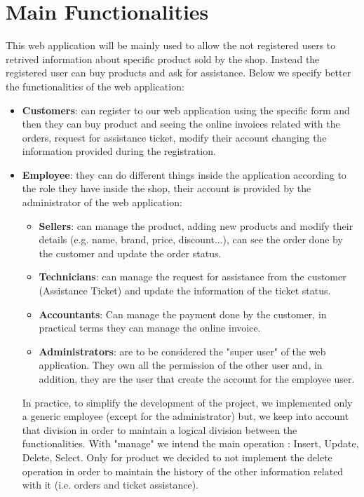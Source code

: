 \section{Main Functionalities}

This web application will be mainly used to allow the not registered users to retrived information about specific product sold by the shop. Instead the registered user can buy products and ask for assistance. Below we specify better the functionalities of the web application:
\begin{itemize}
    \item \textbf{Customers}: can register to our web application using the specific form and then they can buy product and seeing the online invoices related with the orders, request for assistance ticket, modify their account changing the information provided during the registration.
    \item \textbf{Employee}: they can do different things inside the application according to the role they have inside the shop, their account is provided by the administrator of the web application:
    \begin{itemize}
        \item \textbf{Sellers}: can manage the product, adding new products and modify their details (e.g. name, brand, price, discount...), can see the order done by the customer and update the order status.
        \item \textbf{Technicians}: can manage the request for assistance from the customer (Assistance Ticket) and update the information of the ticket status.
        \item \textbf{Accountants}: Can manage the payment done by the customer, in practical terms they can manage the online invoice.
        \item \textbf{Administrators}: are to be considered the "super user" of the web application. They own all the permission of the other user and, in addition, they are the user that create the account for the employee user.
    \end{itemize}
    In practice, to simplify the development of the project, we implemented only a generic employee (except for the administrator) but, we keep into account that division in order to maintain a logical division between the functionalities.
    With "manage" we intend the main operation : Insert, Update, Delete, Select. Only for product we decided to not implement the delete operation in order to maintain the history of the other information related with it (i.e. orders and ticket assistance).
\end{itemize}